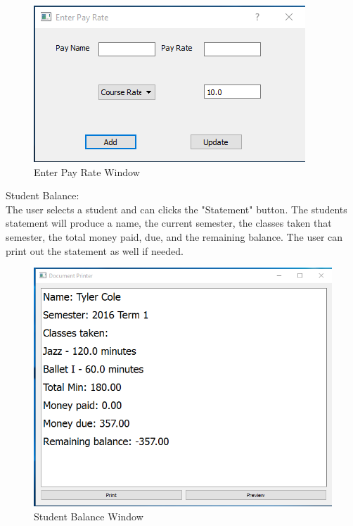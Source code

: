 \begin{figure}
  \includegraphics[width=\linewidth]{pics/userGuide/enterPay.png}
  \caption{Enter Pay Rate Window} 
  \label{fig:User doc: Enter Pay Rate}
\end{figure}

Student Balance:\\
The user selects a student and can clicks the "Statement" button. The students statement will produce a name, the current semester, the classes taken that semester, the total money paid, due, and the remaining balance. The user can print out the statement as well if needed.\\

\begin{figure}
  \includegraphics[width=\linewidth]{pics/userGuide/stuBalence.png}
  \caption{Student Balance Window} 
  \label{fig:User doc: Student Balance}
\end{figure}

